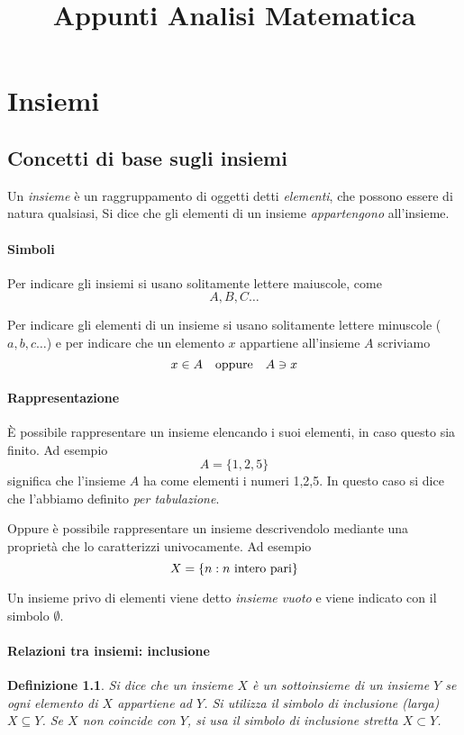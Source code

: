 \documentclass[11pt]{book}
\title{Appunti Analisi Matematica}
\newtheorem{definition}{Definizione}[chapter]
\begin{document}
\tableofcontents

\newpage
{}
\chapter{Insiemi}
\section{Concetti di base sugli insiemi}
Un \textit{insieme} è un raggruppamento di oggetti detti \textit{elementi}, che possono essere di natura qualsiasi, Si 
dice che gli elementi di un insieme \textit{appartengono} all'insieme.
\subsubsection{Simboli}
Per indicare gli insiemi si usano solitamente lettere maiuscole, come
\begin{equation*}
    A,B,C\dots
\end{equation*}

Per indicare gli elementi di un insieme si usano solitamente lettere minuscole ($a,b,c\dots$) e per indicare che un elemento 
$x$ appartiene all'insieme $A$ scriviamo
\begin{equation*}
    x\in A \quad \textnormal{oppure} \quad A\ni x
\end{equation*}
\subsubsection{Rappresentazione}
È possibile rappresentare un insieme elencando i suoi elementi, in caso questo sia finito. Ad esempio
\begin{equation*}
    A=\{1,2,5\}
\end{equation*}
significa che l'insieme $A$ ha come elementi i numeri 1,2,5. In questo caso si dice che l'abbiamo definito \textit{per tabulazione}.

Oppure è possibile rappresentare un insieme descrivendolo mediante una proprietà che lo caratterizzi univocamente. Ad esempio
\begin{equation*}
    X=\{n:n \textnormal{ intero pari}\}
\end{equation*}

Un insieme privo di elementi viene detto \textit{insieme vuoto} e viene indicato con il simbolo $\emptyset$.
\subsubsection{Relazioni tra insiemi: inclusione}
\begin{definition}
    Si dice che un insieme $X$ è un sottoinsieme di un insieme $Y$ se ogni elemento di $X$ appartiene ad $Y$. Si utilizza 
    il simbolo di inclusione (larga) $X\subseteq Y$. Se $X$ non coincide con $Y$, si usa il simbolo di inclusione stretta
    $X\subset Y$.
\end{definition}
\end{document}
